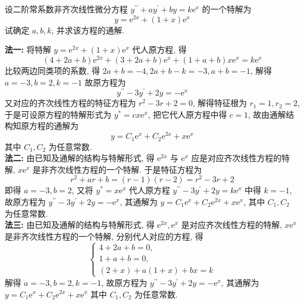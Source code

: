 \begin{example}[1993 数三]
    设二阶常系数非齐次线性微分方程 $ y^{\prime \prime}+a y^{\prime}+b y=k \mathrm{e}^{x} $ 的一个特解为 $$ y=\mathrm{e}^{2 x}+(1+x) \mathrm{e}^{x} $$ 试确定 $ a, b, k $, 并求该方程的通解.
\end{example}
\begin{solution}
    \textbf{法一: }
    将特解 $ y=\mathrm{e}^{2 x}+(1+x) \mathrm{e}^{x} $ 代人原方程, 得
    $$(4+2 a+b) \mathrm{e}^{2 x}+(3+2 a+b) \mathrm{e}^{x}+(1+a+b) x \mathrm{e}^{x}=k \mathrm{e}^{x} $$
    比较两边同类项的系数, 得 $ 2 a+b=-4,2 a+b-k=-3, a+b=-1 $, 解得 $ a=-3 , b=2, k=-1 $ 故原方程为
    $$y^{\prime \prime}-3 y^{\prime}+2 y=-\mathrm{e}^{x} $$
    又对应的齐次线性方程的特征方程为 $ r^{2}-3 r+2=0 $, 解得特征根为 $ r_{1}=1, r_{2}=2 $, 于是可设原方程的特解形式为 $ y^{*}=c x \mathrm{e}^{x} $, 把它代人原方程中得 $ c=1 $, 故由通解结构知原方程的通解为 $$ y=C_{1} \mathrm{e}^{x}+C_{2} \mathrm{e}^{2 x}+x \mathrm{e}^{x}$$ 其中 $ C_{1}, C_{2} $ 为任意常数.\\
    \textbf{法二: }
    由已知及通解的结构与特解形式, 得 $ \mathrm{e}^{2 x} $ 与 $ \mathrm{e}^{x} $ 应是对应齐次线性方程的特解, $ x \mathrm{e}^{x} $ 是非齐次线性方程的一个特解. 于是特征方程为 $$ r^{2}+a r+b=(r-1)(r-2)=r^{2}-3 r+2$$
    即得 $ a=-3, b=2$, 又将 $ y^{*}=x \mathrm{e}^{x} $ 代人原方程 $ y^{\prime \prime}-3 y^{\prime}+2 y=k \mathrm{e}^{x} $ 中得 $ k=-1$, 故原方程为 $ y^{\prime \prime}-3 y^{\prime}+2 y=-\mathrm{e}^{x} $, 其通解为 $ y=C_{1} \mathrm{e}^{x}+C_{2} \mathrm{e}^{2 x}+x \mathrm{e}^{x} $, 其中 $ C_{1}, C_{2} $ 为任意常数.\\
    \textbf{法三: }由已知及通解的结构与特解形式, 得 $ \mathrm{e}^{2 x}, \mathrm{e}^{x} $ 是对应齐次线性方程的特解, $ x \mathrm{e}^{x} $ 是非齐次线性方程的一个特解, 分别代人对应的方程, 得
    $$ \begin{cases}
            4+2 a+b=0, \\ 1+a+b=0, \\ (2+x)+a(1+x)+b x=k
        \end{cases}$$
    解得 $ a=-3, b=2, k=-1 $, 故原方程为 $ y^{\prime \prime}-3 y^{\prime}+   2 y=-\mathrm{e}^{x} $, 其通解为 $ y=C_{1} \mathrm{e}^{x}+C_{2} \mathrm{e}^{2 x}+x \mathrm{e}^{x} $ 其中 $ C_{1}, C_{2} $ 为任意常数.
\end{solution}

